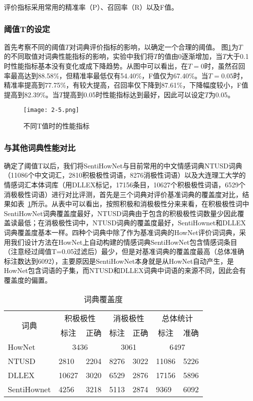 评价指标采用常用的精准率（P）、召回率（R）以及F值。
\subsubsection{阈值T的设定}
首先考察不同的阈值$ T $对词典评价指标的影响，以确定一个合理的阈值。
图\ref{fig2-5}为$ T $的不同取值对词典性能指标的影响，实验中我们将$ T $的值由0逐渐增加，当$ T $大于0.1时性能指标基本没有变化或成下降趋势。从图中可以看出，在$ T=0 $时，虽然召回率最高达到88.58\%，但精准率最低仅有54.40\%，F值仅为67.40\%。当$ T=0.05 $时，精准率提高到77.75\%，有较大提高，召回率仅下降到87.61\%，下降幅度较小，F值提高到82.39\%。当$ T $提高到0.05时性能指标达到最好，因此可以设定$ T $为0.05。

\begin{figure}[htp]
\centering
\texttt{[image: 2-5.png]}
\caption{不同T值时的性能指标}
\label{fig2-5}
\end{figure}

\subsubsection{与其他词典性能对比}
确定了阈值T以后，我们将SentiHowNet与目前常用的中文情感词典NTUSD词典（11086个中文词汇，2810积极极性词语，8276消极性词语）以及大连理工大学的情感词汇本体词库（用DLLEX标记，17156条目，10627个积极极性词语，6529个消极极性词语）进行对比评测，首先是三个词典对评价基准词典的覆盖度对比，结果如表~\ref{tab2-2}所示。从表中可以看出，按照积极和消极极性分来来看，在积极极性词中SentiHowNet词典覆盖度最好，NTUSD词典由于包含的积极极性词数量少因此覆盖读最低；在消极极性词中，NTUSD词典的覆盖度最好，SentiHownet和DLLEX词典覆盖度基本一样。四种个词典中除了作为基准词典的HowNet评价词词典，采用我们设计方法在HowNet上自动构建的情感词典SentiHowNet包含情感词条目（注意经过阈值T=0.05过滤后）最少，但是对基准词典的覆盖度最高（总体准确标注数达到6092），主要原因是SentiHowNet本身就是从HowNet自动产生，是HowNet包含词语的子集，而NTUSD和DLLEX词典中词语的来源不同，因此会有覆盖度的偏置。

\begin{table}[htp]
\centering
\caption{词典覆盖度}
\label{tab2-2}
\begin{tabular}{|l|l|l|l|l|l|l|}
\hline
\multicolumn{1}{|c|}{\multirow{2}{*}{词典}} & \multicolumn{2}{c|}{积极极性} & \multicolumn{2}{c|}{消极极性} & \multicolumn{2}{c|}{总体统计} \\ \cline{2-7} 
\multicolumn{1}{|c|}{} & \multicolumn{1}{c|}{标注} & \multicolumn{1}{c|}{正确} & \multicolumn{1}{c|}{标注} & \multicolumn{1}{c|}{正确} & \multicolumn{1}{c|}{标注} & \multicolumn{1}{c|}{准确} \\ \hline
HowNet & \multicolumn{2}{c|}{3436} & \multicolumn{2}{c|}{3061} & \multicolumn{2}{c|}{6497} \\ \hline
NTUSD & 2810 & 2204 & 8276 & 3022 & 11086 & 5226 \\ \hline
DLLEX & 10627 & 3020 & 6529 & 2876 & 17156 & 5896 \\ \hline
SentiHownet & 4256 & 3218 & 5113 & 2874 & 9369 & 6092 \\ \hline
\end{tabular}
\end{table}


